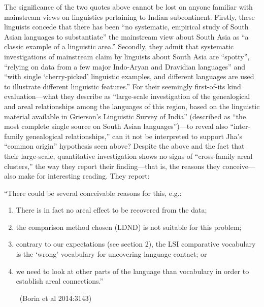 The significance of the two quotes above cannot be lost on anyone familiar with mainstream views on linguistics pertaining to Indian subcontinent. Firstly, these linguists concede that there has been “no systematic, empirical study of South Asian languages to substantiate” the mainstream view about South Asia as “a classic example of a linguistic area.” Secondly, they admit that systematic investigations of mainstream claim by linguists about South Asia are “spotty”, “relying on data from a few major Indo-Aryan and Dravidian languages” and “with single ‘cherry-picked’ linguistic examples, and different languages are used to illustrate different linguistic features.” For their seemingly first-of-its kind evaluation—what they describe as “large-scale investigation of the genealogical and areal relationships among the languages of this region, based on the linguistic material available in Grierson’s Linguistic Survey of India” (described as “the most complete single source on South Asian languages”)—to reveal also “inter-family genealogical relationships,” can it not be interpreted to support Jha’s “common origin” hypothesis seen above? Despite the above and the fact that their large-scale, quantitative investigation shows no signs of “cross-family areal clusters,” the way they report their finding—that is, the reasons they conceive—also make for interesting reading. They report:

\begin{myquote}
“There could be several conceivable reasons for this, e.g.:
\end{myquote}

\begin{enumerate}
\item There is in fact no areal effect to be recovered from the data;

 \item the comparison method chosen (LDND) is not suitable for this problem;

 \item contrary to our expectations (see section 2), the LSI comparative vocabulary is the ‘wrong’ vocabulary for uncovering language contact; or
 
 \item we need to look at other parts of the language than vocabulary in order to establish areal connections.”

~\hfill (Borin et al 2014:3143)

\end{enumerate}

